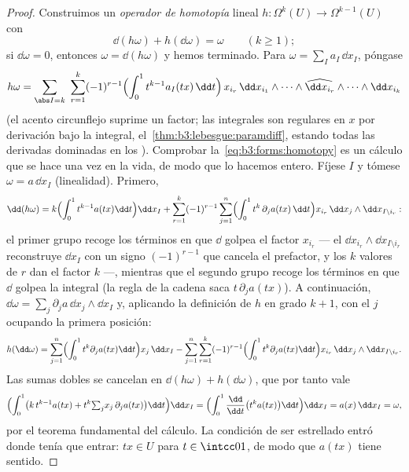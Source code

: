 \begin{proof}
Construimos un \emph{operador de homotopía} lineal $h\colon
\Omega^k(U) \to \Omega^{k-1}(U)$ con
\begin{equation}\label{eq:b3:forms:homotopy}
\dd(h\omega) + h(\dd\omega) = \omega
\qquad (k \geq 1);
\end{equation}
si $\dd\omega = 0$, entonces $\omega = \dd(h\omega)$ y hemos terminado.
Para $\omega = \sum_I a_I\,\dd x_I$, póngase
\[
h\omega = \sum_{\abs I = k}\ \sum_{r=1}^{k}(-1)^{r-1}
\Bigl(\int_0^1 t^{k-1}a_I(tx)\,\dd t\Bigr)\,
x_{i_r}\,\dd x_{i_1}\wedge\dots\wedge
\widehat{\dd x_{i_r}}\wedge\dots\wedge\dd x_{i_k}
\]
(el acento circunflejo suprime un factor; las integrales son regulares
en $x$ por derivación bajo la integral,
el~\cref{thm:b3:lebesgue:paramdiff}, estando todas las derivadas
dominadas en los ). Comprobar
la~\eqref{eq:b3:forms:homotopy} es un cálculo que se hace una vez en la
vida, de modo que lo hacemos entero. Fíjese $I$ y tómese $\omega =
a\,\dd x_I$ (linealidad). Primero,
\[
\dd(h\omega) = k\Bigl(\int_0^1t^{k-1}a(tx)\dd t\Bigr)\dd x_I
+ \sum_{r=1}^k(-1)^{r-1}\sum_{j=1}^n
\Bigl(\int_0^1t^{k}\,\partial_ja(tx)\,\dd t\Bigr)
x_{i_r}\,\dd x_j\wedge\dd x_{I\setminus i_r} :
\]
el primer grupo recoge los términos en que $\dd$ golpea el factor
$x_{i_r}$ --- el  $\dd x_{i_r}\wedge\dd
x_{I\setminus i_r}$ reconstruye $\dd x_I$ con un signo $(-1)^{r-1}$ que
cancela el prefactor, y los $k$ valores de $r$ dan el factor $k$ ---,
mientras que el segundo grupo recoge los términos en que $\dd$ golpea la
integral (la regla de la cadena saca $t\,\partial_ja(tx)$). A
continuación, $\dd\omega =
\sum_j\partial_ja\,\dd x_j\wedge\dd x_I$ y, aplicando la definición de
$h$ en grado $k+1$, con el  $j$ ocupando la primera posición:
\[
h(\dd\omega) = \sum_{j=1}^n\Bigl(\int_0^1t^{k}
\partial_ja(tx)\dd t\Bigr)x_j\,\dd x_I
- \sum_{j=1}^n\sum_{r=1}^k(-1)^{r-1}
\Bigl(\int_0^1t^{k}\partial_ja(tx)\dd t\Bigr)
x_{i_r}\,\dd x_j\wedge\dd x_{I\setminus i_r} .
\]
Las sumas dobles se cancelan en $\dd(h\omega) + h(\dd\omega)$, que por
tanto vale
\[
\Bigl(\int_0^1\bigl(k\,t^{k-1}a(tx) +
t^k{\textstyle\sum_j}x_j\,\partial_ja(tx)\bigr)\dd t\Bigr)
\dd x_I
= \Bigl(\int_0^1\frac{\dd}{\dd t}\bigl(t^ka(tx)\bigr)\dd
t\Bigr)\dd x_I
= a(x)\,\dd x_I = \omega,
\]
por el teorema fundamental del cálculo. La condición de ser estrellado
entró donde tenía que entrar: $tx \in U$ para $t \in \intcc01$, de modo
que $a(tx)$ tiene sentido.
\end{proof}

